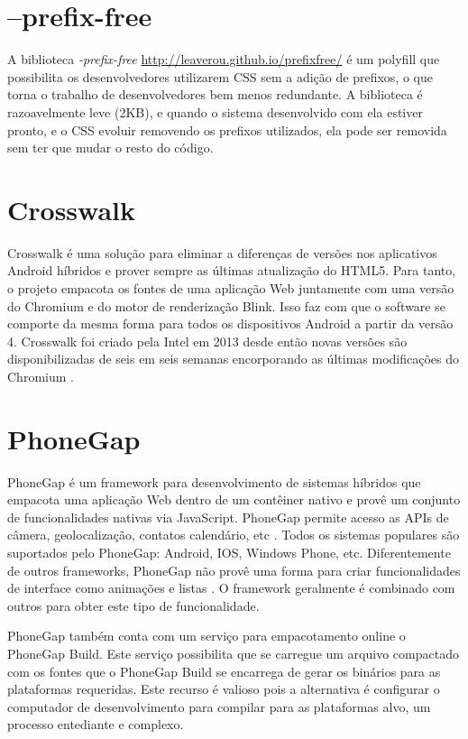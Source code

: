 \section{--prefix-free}

A biblioteca \textit{-prefix-free} \url{http://leaverou.github.io/prefixfree/}
é um polyfill que possibilita os desenvolvedores utilizarem CSS sem
a adição de prefixos, o que torna o trabalho de desenvolvedores bem
menos redundante. A biblioteca é razoavelmente leve (2KB), e quando o
sistema desenvolvido com ela estiver pronto, e o CSS evoluir removendo os
prefixos utilizados, ela pode ser removida sem ter que mudar o resto do código.

\section{Crosswalk} \label{crosswalk}

Crosswalk é uma solução para eliminar a diferenças de versões nos
aplicativos Android híbridos e prover sempre as últimas atualização
do HTML5. Para tanto, o projeto empacota os fontes de uma aplicação
Web juntamente com uma versão do Chromium e do motor de renderização
Blink. Isso faz com que o software se comporte da mesma forma para todos
os dispositivos Android a partir da versão 4. Crosswalk foi criado
pela Intel em 2013 desde então novas versões são disponibilizadas
de seis em seis semanas encorporando as últimas modificações do Chromium
\textsc{\autocite{crosswalkProject}}.

\section{PhoneGap}

PhoneGap é um framework para desenvolvimento de sistemas híbridos que
empacota uma aplicação Web dentro de um contêiner nativo e provê um
conjunto de funcionalidades nativas via JavaScript. PhoneGap permite
acesso as APIs de câmera, geolocalização, contatos calendário,
etc \textsc{\autocite[p. 3]{crossPlatformAppsAnimations}}. Todos os sistemas
populares são suportados pelo PhoneGap: Android, IOS, Windows Phone,
etc. Diferentemente de outros frameworks, PhoneGap não provê uma
forma para criar funcionalidades de interface como animações e listas
\textsc{\autocite[p. 15]{viabilityBusinessApplications}}. O framework 
geralmente é combinado com outros para obter este tipo de funcionalidade.

PhoneGap também conta com um serviço para empacotamento online o
PhoneGap Build. Este serviço possibilita que se carregue um arquivo
compactado com os fontes que o PhoneGap Build se encarrega de gerar os
binários para as plataformas requeridas. Este recurso é valioso pois a
alternativa é configurar o computador de desenvolvimento para compilar
para as plataformas alvo, um processo entediante e complexo.

